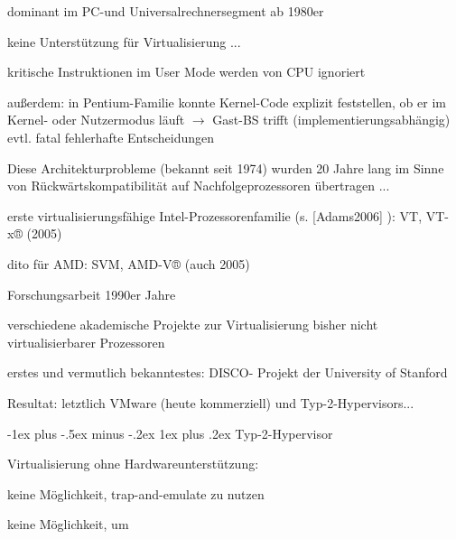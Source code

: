 \documentclass[a4paper]{article}
\makeatletter
\renewcommand{\subsubsection}{\@startsection{subsubsection}{3}{0mm}%
 {-1ex plus -.5ex minus -.2ex}%
 {1ex plus .2ex}%
 {\normalfont\small\bfseries}}
\makeatother
\begin{document}
\begin{multicols}{3}
    \begin{itemize*}
        \item
        dominant im PC-und Universalrechnersegment ab 1980er
        \item
        keine Unterstützung für Virtualisierung ...
        \item
        kritische Instruktionen im User Mode werden von CPU ignoriert
        \item
        außerdem: in Pentium-Familie konnte Kernel-Code explizit feststellen,
        ob er im Kernel- oder Nutzermodus läuft $\rightarrow$
        Gast-BS trifft (implementierungsabhängig) evtl. fatal fehlerhafte
        Entscheidungen
        \item
        Diese Architekturprobleme (bekannt seit 1974) wurden 20 Jahre lang im
        Sinne von Rückwärtskompatibilität auf Nachfolgeprozessoren übertragen
        ...
        \begin{itemize*}
            \item erste virtualisierungsfähige Intel-Prozessorenfamilie (s. [Adams2006] ): VT, VT-x® (2005)
            \item dito für AMD: SVM, AMD-V® (auch 2005)
        \end{itemize*}
    \end{itemize*}

    Forschungsarbeit 1990er Jahre

    \begin{itemize*}
        \item
        verschiedene akademische Projekte zur Virtualisierung bisher nicht
        virtualisierbarer Prozessoren
        \item
        erstes und vermutlich bekanntestes: DISCO- Projekt der University of
        Stanford
        \item
        Resultat: letztlich VMware (heute kommerziell) und
        Typ-2-Hypervisors...
    \end{itemize*}


    \subsubsection{Typ-2-Hypervisor}


    Virtualisierung ohne Hardwareunterstützung:

    \begin{itemize*}
        \item
        keine Möglichkeit, trap-and-emulate zu nutzen
        \item
        keine Möglichkeit, um
        \begin{enumerate*}


\end{enumerate*}
\end{itemize*}
\end{multicols}
\end{document}
